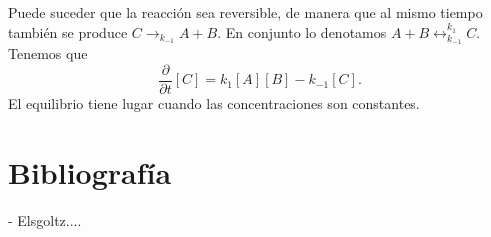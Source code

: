 \documentclass{article}
\begin{document}
Puede suceder que la reacción sea reversible, de manera que al mismo tiempo también se produce
$C \rightarrow_{k_{-1}} A+B$. En conjunto lo denotamos $A+B \leftrightarrow_{k_{-1}}^{k_1}
C$. Tenemos que
\[ \frac{\partial}{\partial t}[C] = k_1 [A][B] - k_{-1}[C]. \]
El equilibrio tiene lugar cuando las concentraciones son constantes.

\section{Bibliografía}

- Elsgoltz....
\end{document}
